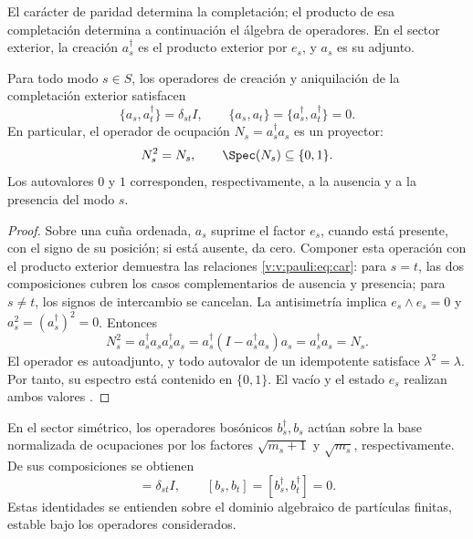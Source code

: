 El carácter de paridad determina la completación; el producto de esa
completación determina a continuación el álgebra de operadores. En el
sector exterior, la creación \(a_s^\dagger\) es el producto exterior por
\(e_s\), y \(a_s\) es su adjunto.

\begin{theorem}
\label{v:v:rec:completaciones:statement:01}
\label{v:v:rec:thm:principio-exclusion-pauli}
Para todo modo \(s\in S\), los operadores de creación y aniquilación de la
completación exterior satisfacen
\begin{equation}
 \{a_s,a_t^\dagger\}=\delta_{st}I,
 \qquad
 \{a_s,a_t\}=\{a_s^\dagger,a_t^\dagger\}=0.
 \label{v:v:pauli:eq:car}
\end{equation}
En particular, el operador de ocupación
\(N_s=a_s^\dagger a_s\) es un proyector:
\begin{equation}
 N_s^2=N_s,
 \qquad \Spec(N_s)\subseteq\{0,1\}.
 \label{v:v:pauli:eq:proyeccion-ocupacion}
\end{equation}
Los autovalores \(0\) y \(1\) corresponden, respectivamente, a la ausencia
y a la presencia del modo \(s\).
\end{theorem}

\begin{proof}
Sobre una cuña ordenada, \(a_s\) suprime el factor \(e_s\), cuando está
presente, con el signo de su posición; si está ausente, da cero. Componer
esta operación con el producto exterior demuestra las relaciones
\eqref{v:v:pauli:eq:car}: para \(s=t\), las dos composiciones cubren los casos
complementarios de ausencia y presencia; para \(s\ne t\), los signos de
intercambio se cancelan. La antisimetría implica
\(e_s\wedge e_s=0\) y
\(a_s^2=(a_s^\dagger)^2=0\). Entonces
\begin{equation}
 N_s^2=a_s^\dagger a_s a_s^\dagger a_s
 =a_s^\dagger(I-a_s^\dagger a_s)a_s
 =a_s^\dagger a_s=N_s.
 \label{v:v:pauli:eq:prueba-idempotencia}
\end{equation}
El operador es autoadjunto, y todo autovalor de un idempotente satisface
\(\lambda^2=\lambda\). Por tanto, su espectro está contenido en
\(\{0,1\}\). El vacío y el estado \(e_s\) realizan ambos valores
\cite{v:Pauli1925,v:Dirac1926}.
\end{proof}

En el sector simétrico, los operadores bosónicos \(b_s^\dagger,b_s\)
actúan sobre la base normalizada de ocupaciones por los factores
\(\sqrt{m_s+1}\) y \(\sqrt{m_s}\), respectivamente. De sus composiciones
se obtienen
\begin{equation}
 [b_s,b_t^\dagger]=\delta_{st}I,
 \qquad [b_s,b_t]=[b_s^\dagger,b_t^\dagger]=0.
 \label{v:v:pauli:eq:ccr}
\end{equation}
Estas identidades se entienden sobre el dominio algebraico de partículas
finitas, estable bajo los operadores considerados.

